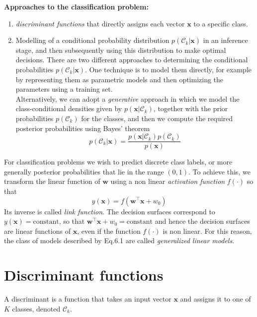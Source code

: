 \documentclass[twoside]{article}
\begin{document}
\textbf{Approaches to the classification problem:}
\begin{enumerate}
    \item \textit{discriminant functions} that directly assigns each vector $\boldsymbol{x}$ to a specific class.
    \item Modelling of a conditional probability distribution $p(\mathcal{C}_k| \boldsymbol{x})$ in an inference stage, and then subsequently using this distribution to make optimal decisions. There are two different approaches to determining the conditional probabilities $p(\mathcal{C}_k| \boldsymbol{x})$. One technique is to model them directly, for example by representing them as parametric models and then optimizing the parameters using a training set.\\
    Alternatively, we can adopt a \textit{generative} approach in which we model the class-conditional densities given by $p(\boldsymbol{x}|\mathcal{C}_k)$, together with the prior probabilities $p(\mathcal{C}_k)$ for the classes, and then we compute the required posterior probabilities using Bayes' theorem
    \begin{equation*}
        p(\mathcal{C}_k| \boldsymbol{x}) = \frac{p(\boldsymbol{x}|\mathcal{C}_k)p(\mathcal{C}_k)}{p(\boldsymbol{x})}
    \end{equation*}
\end{enumerate}
For classification problems we wish to predict discrete class labels, or more generally posterior probabilities that lie in the range $(0, 1)$. To achieve this, we transform the linear function of $\boldsymbol{w}$ using a non linear \textit{activation function} $f(\cdot)$ so that
\begin{equation}
    y(\boldsymbol{x}) = f(\boldsymbol{w^\intercal x} + w_0)
\end{equation}
Its inverse is called \textit{link function}. The decision surfaces correspond to $y(\boldsymbol{x}) = \text{constant}$, so that $\boldsymbol{w^\intercal x} + w_0 = \text{constant}$ and hence the decision surfaces are linear functions of $\boldsymbol{x}$, even if the function $f(\cdot)$ is non linear. For this reason, the class of models described by Eq.6.1 are called \textit{generalized linear models}.

\section{Discriminant functions}
A discriminant is a function that takes an input vector $\boldsymbol{x}$ and assigns it to one of $K$ classes, denoted $\mathcal{C}_k$.
\end{document}
